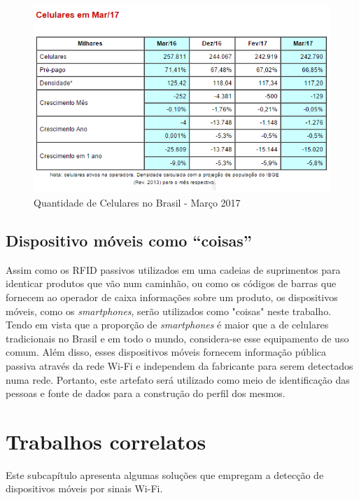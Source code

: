 \begin{figure}[htb]
  \caption{\label{dados2017}Quantidade de Celulares no Brasil - Março 2017}
  \begin{center}
    \includegraphics[width=1.0\textwidth]{img/dados2017.png}
  \end{center}
\end{figure}

\subsection{Dispositivo móveis como ``coisas''}
\label{dispositivo-coisa}
Assim como os RFID passivos utilizados em uma cadeias de suprimentos para identicar produtos que vão num caminhão, ou como os códigos de barras
que fornecem ao operador de caixa informações sobre um produto, os dispositivos móveis, como os \emph{smartphones}, serão utilizados
como "coisas" neste trabalho. Tendo em vista que a proporção de \emph{smartphones} é maior que a de celulares tradicionais no Brasil e em
todo o mundo, considera-se esse equipamento de uso comum. Além disso, esses dispositivos móveis fornecem informação pública passiva
através da rede Wi-Fi e independem da fabricante para serem detectados numa rede. Portanto, este artefato será utilizado como meio
de identificação das pessoas e fonte de dados para a construção do perfil dos mesmos.

\section{Trabalhos correlatos}
\label{trabalhos-correlatos}
Este subcapítulo apresenta algumas soluções que
empregam a detecção de dispositivos móveis por sinais Wi-Fi.


